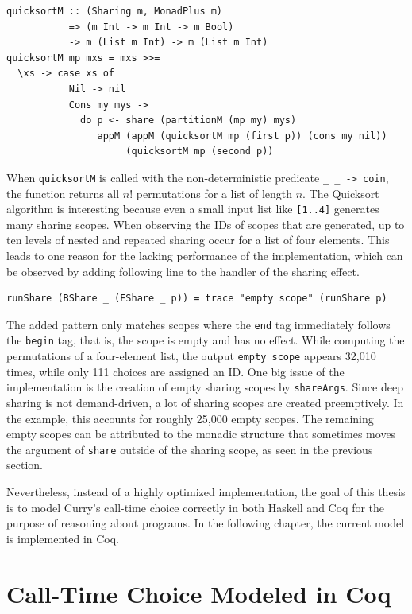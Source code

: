 \documentclass[a4paper, 11pt, fleqn, twoside]{scrreprt}
\newcommand{\hinl}[1]{\texttt{#1}}
\begin{document}
\begin{verbatim}
quicksortM :: (Sharing m, MonadPlus m) 
           => (m Int -> m Int -> m Bool) 
           -> m (List m Int) -> m (List m Int)
quicksortM mp mxs = mxs >>=
  \xs -> case xs of
           Nil -> nil
           Cons my mys ->
             do p <- share (partitionM (mp my) mys)
                appM (appM (quicksortM mp (first p)) (cons my nil)) 
                     (quicksortM mp (second p))
\end{verbatim}

When \hinl{quicksortM} is called with the non-deterministic predicate \hinl{\_ _ -> coin}, the function returns all $n!$ permutations for a list of length $n$.
The Quicksort algorithm is interesting because even a small input list like \hinl{[1..4]} generates many sharing scopes.
When observing the IDs of scopes that are generated, up to ten levels of nested and repeated sharing occur for a list of four elements.
This leads to one reason for the lacking performance of the implementation, which can be observed by adding following line to the handler of the sharing effect.

\begin{verbatim}
runShare (BShare _ (EShare _ p)) = trace "empty scope" (runShare p)
\end{verbatim}

The added pattern only matches scopes where the \hinl{end} tag immediately follows the \hinl{begin} tag, that is, the scope is empty and has no effect.
While computing the permutations of a four-element list, the output \hinl{empty scope} appears 32,010 times, while only 111 choices are assigned an ID.
One big issue of the implementation is the creation of empty sharing scopes by \hinl{shareArgs}.
Since deep sharing is not demand-driven, a lot of sharing scopes are created preemptively.
In the example, this accounts for roughly 25,000 empty scopes.
The remaining empty scopes can be attributed to the monadic structure that sometimes moves the argument of \hinl{share} outside of the sharing scope, as seen in the previous section.

Nevertheless, instead of a highly optimized implementation, the goal of this thesis is to model Curry's call-time choice correctly in both Haskell and Coq for the purpose of reasoning about programs.
In the following chapter, the current model is implemented in Coq.



\chapter{Call-Time Choice Modeled in Coq}
\label{ch:callTimeChoiceCoq}
\end{document}
